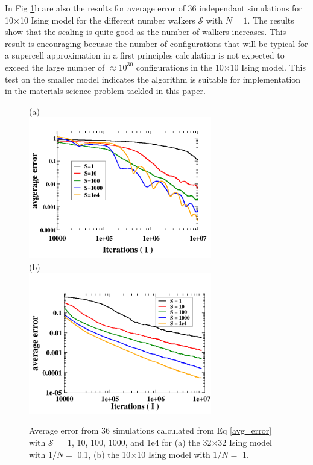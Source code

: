 \documentclass[aps,prl,reprint,superscriptaddress,showkeys]{revtex4-1}
\begin{document}
In Fig \ref{thirtytwo_Stest}b are also the results for average error of 36 independant simulations for 10$\times$10 Ising model for the different number walkers $\mathcal{S}$ with $N=1$. The results show that the scaling is quite good as the number of walkers increases. This result is encouraging becuase the number of configurations that will be typical for a supercell approximation in a first principles calculation is not expected to exceed the large number of $\approx 10^{30}$ configurations in the 10$\times$10 Ising model.  This test on the smaller model indicates the algorithm  is suitable for implementation in the materials science problem tackled in this paper. 
\begin{figure}[h!]
(a)\\
\includegraphics[width=8cm]{./figures/thirtytwo_root0_1_varyS.png}\\
(b)\\
\includegraphics[width=8cm]{./figures/10X10_root1_varyS.png}
\caption{ Average error from 36 simulations calculated from Eq \ref{avg_error} with $\mathcal{S}=$ 1, 10, 100, 1000, and 1e4 for  (a) the 32$\times$32 Ising model with $1/N=$ 0.1, (b) the 10$\times$10 Ising model with $1/N =$ 1. \label{thirtytwo_Stest} }
\end{figure}
\end{document}
